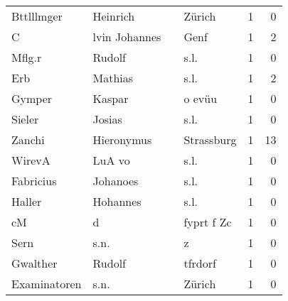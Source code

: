 \begin{center}
\begin{tiny}
\begin{longtabu}{llllrr}
               Bttlllmger &                           Heinrich &             &                                      Zürich &          1 &         0 \\
                        C &                      lvin Johannes &             &                                        Genf &          1 &         2 \\
                   Mflg.r &                             Rudolf &             &                                        s.l. &          1 &         0 \\
                      Erb &                            Mathias &             &                                        s.l. &          1 &         2 \\
                   Gymper &                             Kaspar &             &                                      o evüu &          1 &         0 \\
                   Sieler &                             Josias &             &                                        s.l. &          1 &         0 \\
                   Zanchi &                         Hieronymus &             &                                  Strassburg &          1 &        13 \\
                   WirevA &                             LuA vo &             &                                        s.l. &          1 &         0 \\
                Fabricius &                           Johanoes &             &                                        s.l. &          1 &         0 \\
                   Haller &                           Hohannes &             &                                        s.l. &          1 &         0 \\
                       cM &                                  d &             &                                  fyprt f Zc &          1 &         0 \\
                     Sern &                               s.n. &             &                                           z &          1 &         0 \\
                 Gwalther &                             Rudolf &             &                                     tfrdorf &          1 &         0 \\
             Examinatoren &                               s.n. &             &                                      Zürich &          1 &         0 \\

\end{longtabu}
\end{tiny}
\end{center}
